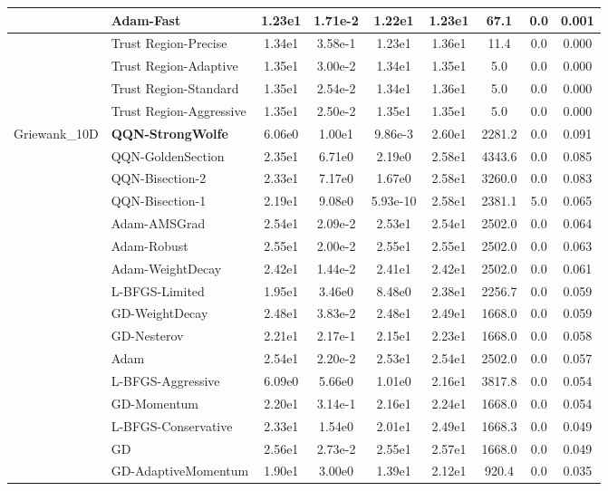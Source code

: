 \documentclass[10pt]{article}
\begin{document}
\begin{longtable}{|l|l|c|c|c|c|c|c|c|}
\hline
 & Adam-Fast & 1.23e1 & 1.71e-2 & 1.22e1 & 1.23e1 & 67.1 & 0.0 & 0.001 \\
\hline
 & Trust Region-Precise & 1.34e1 & 3.58e-1 & 1.23e1 & 1.36e1 & 11.4 & 0.0 & 0.000 \\
\hline
 & Trust Region-Adaptive & 1.35e1 & 3.00e-2 & 1.34e1 & 1.35e1 & 5.0 & 0.0 & 0.000 \\
\hline
 & Trust Region-Standard & 1.35e1 & 2.54e-2 & 1.34e1 & 1.36e1 & 5.0 & 0.0 & 0.000 \\
\hline
 & Trust Region-Aggressive & 1.35e1 & 2.50e-2 & 1.35e1 & 1.35e1 & 5.0 & 0.0 & 0.000 \\
Griewank\_10D & \textbf{QQN-StrongWolfe} & 6.06e0 & 1.00e1 & 9.86e-3 & 2.60e1 & 2281.2 & 0.0 & 0.091 \\
\hline
 & QQN-GoldenSection & 2.35e1 & 6.71e0 & 2.19e0 & 2.58e1 & 4343.6 & 0.0 & 0.085 \\
\hline
 & QQN-Bisection-2 & 2.33e1 & 7.17e0 & 1.67e0 & 2.58e1 & 3260.0 & 0.0 & 0.083 \\
\hline
 & QQN-Bisection-1 & 2.19e1 & 9.08e0 & 5.93e-10 & 2.58e1 & 2381.1 & 5.0 & 0.065 \\
\hline
 & Adam-AMSGrad & 2.54e1 & 2.09e-2 & 2.53e1 & 2.54e1 & 2502.0 & 0.0 & 0.064 \\
\hline
 & Adam-Robust & 2.55e1 & 2.00e-2 & 2.55e1 & 2.55e1 & 2502.0 & 0.0 & 0.063 \\
\hline
 & Adam-WeightDecay & 2.42e1 & 1.44e-2 & 2.41e1 & 2.42e1 & 2502.0 & 0.0 & 0.061 \\
\hline
 & L-BFGS-Limited & 1.95e1 & 3.46e0 & 8.48e0 & 2.38e1 & 2256.7 & 0.0 & 0.059 \\
\hline
 & GD-WeightDecay & 2.48e1 & 3.83e-2 & 2.48e1 & 2.49e1 & 1668.0 & 0.0 & 0.059 \\
\hline
 & GD-Nesterov & 2.21e1 & 2.17e-1 & 2.15e1 & 2.23e1 & 1668.0 & 0.0 & 0.058 \\
\hline
 & Adam & 2.54e1 & 2.20e-2 & 2.53e1 & 2.54e1 & 2502.0 & 0.0 & 0.057 \\
\hline
 & L-BFGS-Aggressive & 6.09e0 & 5.66e0 & 1.01e0 & 2.16e1 & 3817.8 & 0.0 & 0.054 \\
\hline
 & GD-Momentum & 2.20e1 & 3.14e-1 & 2.16e1 & 2.24e1 & 1668.0 & 0.0 & 0.054 \\
\hline
 & L-BFGS-Conservative & 2.33e1 & 1.54e0 & 2.01e1 & 2.49e1 & 1668.3 & 0.0 & 0.049 \\
\hline
 & GD & 2.56e1 & 2.73e-2 & 2.55e1 & 2.57e1 & 1668.0 & 0.0 & 0.049 \\
\hline
 & GD-AdaptiveMomentum & 1.90e1 & 3.00e0 & 1.39e1 & 2.12e1 & 920.4 & 0.0 & 0.035 \\

\end{longtable}
\end{document}

